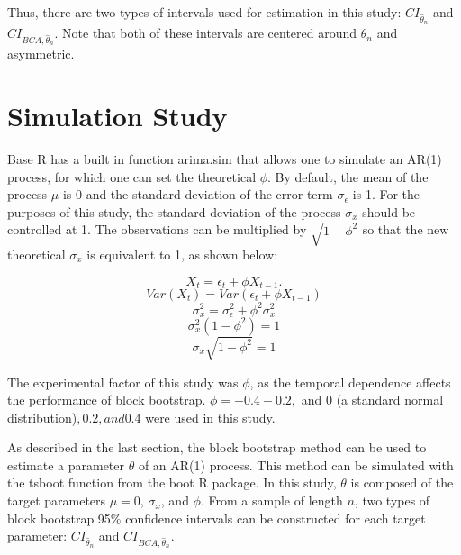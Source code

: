 \documentclass[12pt, letterpaper, titlepage]{article}
\begin{document}
Thus, there are two types of intervals used for estimation in this study: $CI_{\hat{\theta}_{n}}$ and $CI_{BCA, \hat{\theta}_{n}}$. Note that both of these intervals are centered around $\hat{\theta}_{n}$ and asymmetric. 


\section{Simulation Study}
\label{sec:simstudy}





Base R has a built in function arima.sim that allows one to simulate an AR(1) process, for which one can set the theoretical $\phi$. By default, the mean of the process $\mu$ is 0 and the standard deviation of the error term $\sigma_{\epsilon}$ is 1. For the purposes of this study, the standard deviation of the process $\sigma_{x}$ should be controlled at 1. The observations can be multiplied by $\sqrt{1 - \phi^2}$ so that the new theoretical $\sigma_{x}$ is equivalent to 1, as shown below:

\[X_{t} = \epsilon_{t} + \phi X_{t-1}.\]
\[Var(X_{t}) = Var(\epsilon_{t} + \phi X_{t-1})\]
\[\sigma^2_{x} = \sigma^2_{\epsilon} + \phi^2 \sigma^2_{x}\]
\[\sigma^2_{x}(1 - \phi^2) = 1\]
\[\sigma_{x}\sqrt{1 - \phi^2} = 1\]

The experimental factor of this study was $\phi$, as the temporal dependence affects the performance of block bootstrap. $\phi = -0.4 -0.2,$ and $0$ (a standard normal distribution)$, 0.2, and 0.4$ were used in this study. 

As described in the last section, the block bootstrap method can be used to estimate a parameter $\theta$ of an AR(1) process. This method can be simulated with the tsboot function from the boot R package. In this study, $\theta$ is composed of the target parameters $\mu = 0$, $\sigma_{x}$, and $\phi$. From a sample of length $n$, two types of block bootstrap 95\% confidence intervals can be constructed for each target parameter: $CI_{\hat{\theta}_{n}}$ and $CI_{BCA, \hat{\theta}_{n}}$.
\end{document}
